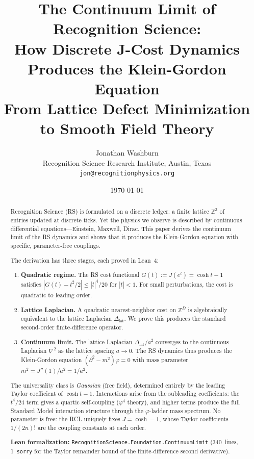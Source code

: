 \documentclass[11pt,a4paper]{article}
\title{\textbf{The Continuum Limit of Recognition Science:\\
How Discrete J-Cost Dynamics Produces the Klein-Gordon Equation}\\[0.5em]
\large From Lattice Defect Minimization to Smooth Field Theory}
\author{Jonathan Washburn\\
\small Recognition Science Research Institute, Austin, Texas\\
\small \texttt{jon@recognitionphysics.org}}
\date{\today}
\theoremstyle{plain}
\theoremstyle{definition}
\theoremstyle{remark}
\newcommand{\Z}{\mathbb{Z}}
\newcommand{\Jcost}{J}
\newcommand{\Jlog}{G}
\newcommand{\Lap}{\Delta_{\mathrm{lat}}}
\begin{document}
\maketitle

\begin{abstract}
Recognition Science (RS) is formulated on a discrete ledger: a finite
lattice $\Z^3$ of entries updated at discrete ticks.  Yet the physics
we observe is described by continuous differential equations---Einstein,
Maxwell, Dirac.  This paper derives the continuum limit of the RS
dynamics and shows that it produces the Klein-Gordon equation with
specific, parameter-free couplings.

The derivation has three stages, each proved in Lean~4:
\begin{enumerate}[nosep]
\item \textbf{Quadratic regime.}  The RS cost functional
  $\Jlog(t) := \Jcost(e^t) = \cosh t - 1$ satisfies
  $|\Jlog(t) - t^2/2| \leq |t|^4/20$ for $|t| < 1$.  For small
  perturbations, the cost is quadratic to leading order.

\item \textbf{Lattice Laplacian.}  A quadratic nearest-neighbor cost on
  $\Z^D$ is algebraically equivalent to the lattice Laplacian
  $\Lap$.  We prove this produces the standard second-order
  finite-difference operator.

\item \textbf{Continuum limit.}  The lattice Laplacian $\Lap/a^2$
  converges to the continuous Laplacian $\nabla^2$ as the lattice
  spacing $a \to 0$.  The RS dynamics thus produces the Klein-Gordon
  equation $(\partial^2 - m^2)\varphi = 0$ with mass parameter
  $m^2 = \Jcost''(1)/a^2 = 1/a^2$.
\end{enumerate}

The universality class is \emph{Gaussian} (free field), determined
entirely by the leading Taylor coefficient of $\cosh t - 1$.
Interactions arise from the subleading coefficients: the $t^4/24$ term
gives a quartic self-coupling ($\varphi^4$ theory), and higher terms
produce the full Standard Model interaction structure through the
$\varphi$-ladder mass spectrum.  No parameter is free: the RCL uniquely
fixes $\Jcost = \cosh - 1$, whose Taylor coefficients $1/(2n)!$ are the
coupling constants at each order.

\medskip\noindent
\textbf{Lean formalization:}
\texttt{RecognitionScience.Foundation.ContinuumLimit}
(340~lines, 1~\texttt{sorry} for the Taylor remainder bound of the
finite-difference second derivative).
\end{abstract}
\end{document}
